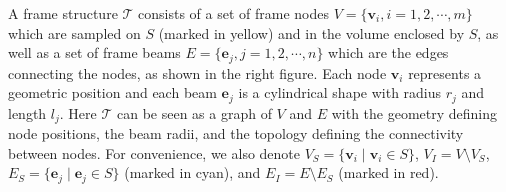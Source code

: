 %
%





%
A frame structure $\mathcal{T}$ consists of a set of frame nodes $V=\{\mathbf{v}_{i}, i=1,2,\cdots,m\}$ which are sampled on $S$ (marked in yellow) and in the volume enclosed by $S$, as well as a set of frame beams $E=\{\mathbf{e}_{j}, j=1,2,\cdots,n\}$ which are the edges connecting the nodes, as shown in the right figure.
%
Each node $\mathbf{v}_{i}$ represents a geometric position and each beam $\mathbf{e}_j$ is a cylindrical shape with radius $r_j$ and length $l_j$.
%
Here $\mathcal{T}$ can be seen as a graph of $V$ and $E$ with the geometry defining node positions, the beam radii, and the topology defining the connectivity between nodes.
%
For convenience, we also denote $V_S=\{\mathbf{v}_{i} \mid \mathbf{v}_{i}\in S\}$, $V_I=V\setminus V_S$,
$E_S=\{\mathbf{e}_j \mid \mathbf{e}_j\in S \}$ (marked in cyan), and $E_I = E\setminus E_S$ (marked in red).



